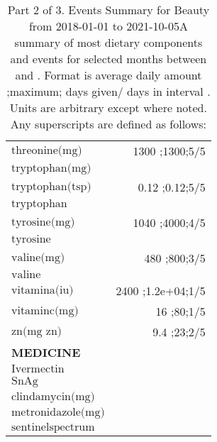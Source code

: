 \begin{table}[H]
\begin{tabular}{|l|r|}
$\textrm{threonine(mg)}$&1300 ;1300;5/5\\
$\textrm{tryptophan(mg)}$&\\
$\textrm{tryptophan(tsp)}$&0.12 ;0.12;5/5\\
$\textrm{tryptophan}$&\\
$\textrm{tyrosine(mg)}$&1040 ;4000;4/5\\
$\textrm{tyrosine}$&\\
$\textrm{valine(mg)}$&480 ;800;3/5\\
$\textrm{valine}$&\\
$\textrm{vitamina(iu)}$&2400 ;1.2e+04;1/5\\
$\textrm{vitaminc(mg)}$&16 ;80;1/5\\
$\textrm{zn(mg~zn)}$&9.4 ;23;2/5\\
{\bf MEDICINE}&\\
$\textrm{Ivermectin}$&\\
$\textrm{SnAg}$&\\
$\textrm{clindamycin(mg)}$&\\
$\textrm{metronidazole(mg)}$&\\
$\textrm{sentinelspectrum}$&\\
\hline
\end{tabular}
\caption{Part 2 of 3.  Events Summary for Beauty   from 2018-01-01 to 2021-10-05A summary of most dietary components and events  for selected months between \mjmdatemin and \mjmdatemax. Format is average daily amount ;maximum; days given/ days in interval . Units are arbitrary except where noted. Any  superscripts are defined as follows:  \mjmsuperscripts}
\end{table}
